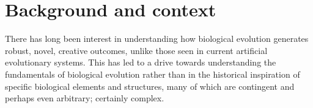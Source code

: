 %
%
%
%
%

\section{Background and context}\label{background-and-context}

There has long been interest in understanding how biological evolution generates robust, novel, creative outcomes, unlike those seen in current artificial evolutionary systems. This has led to a drive towards understanding the fundamentals of biological evolution rather than in the historical inspiration of specific biological elements and structures, many of which are contingent and perhaps even arbitrary; certainly complex.
	
